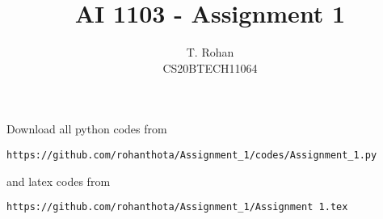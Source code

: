 \documentclass[journal,12pt,twocolumn]{IEEEtran}
\DeclareMathOperator*{\Res}{Res}
\begin{document}
\newcommand{\BEQA}{\begin{eqnarray}}
\newcommand{\EEQA}{\end{eqnarray}}
\newcommand{\define}{\stackrel{\triangle}{=}}

\raggedbottom
\setlength{\parindent}{0pt}
\providecommand{\mbf}{\mathbf}
\providecommand{\pr}[1]{\ensuremath{\Pr\left(#1\right)}}
\providecommand{\qfunc}[1]{\ensuremath{Q\left(#1\right)}}
\providecommand{\sbrak}[1]{\ensuremath{{}\left[#1\right]}}
\providecommand{\lsbrak}[1]{\ensuremath{{}\left[#1\right.}}
\providecommand{\rsbrak}[1]{\ensuremath{{}\left.#1\right]}}
\providecommand{\brak}[1]{\ensuremath{\left(#1\right)}}
\providecommand{\lbrak}[1]{\ensuremath{\left(#1\right.}}
\providecommand{\rbrak}[1]{\ensuremath{\left.#1\right)}}
\providecommand{\cbrak}[1]{\ensuremath{\left\{#1\right\}}}
\providecommand{\lcbrak}[1]{\ensuremath{\left\{#1\right.}}
\providecommand{\rcbrak}[1]{\ensuremath{\left.#1\right\}}}
\theoremstyle{remark}
\newtheorem{rem}{Remark}
\newcommand{\sgn}{\mathop{\mathrm{sgn}}}
\providecommand{\abs}[1]{\vert#1\vert}
\providecommand{\res}[1]{\Res\displaylimits_{#1}} 
\providecommand{\norm}[1]{\lVert#1\rVert}
\providecommand{\mtx}[1]{\mathbf{#1}}
\providecommand{\mean}[1]{E[ #1 ]}
\providecommand{\fourier}{\overset{\mathcal{F}}{ \rightleftharpoons}}
\providecommand{\system}{\overset{\mathcal{H}}{ \longleftrightarrow}}
\newcommand{\solution}{\noindent \textbf{Solution: }}
\newcommand{\cosec}{\,\text{cosec}\,}
\providecommand{\dec}[2]{\ensuremath{\overset{#1}{\underset{#2}{\gtrless}}}}
\newcommand{\myvec}[1]{\ensuremath{\begin{pmatrix}#1\end{pmatrix}}}
\newcommand{\mydet}[1]{\ensuremath{\begin{vmatrix}#1\end{vmatrix}}}
\makeatletter
{}
\makeatother
\let\StandardTheFigure\thefigure
\let\vec\mathbf
\renewcommand{\thefigure}{\theproblem}
\def\putbox#1#2#3{\makebox[0in][l]{\makebox[#1][l]{}\raisebox{\baselineskip}[0in][0in]{\raisebox{#2}[0in][0in]{#3}}}}
     \def\rightbox#1{\makebox[0in][r]{#1}}
     \def\centbox#1{\makebox[0in]{#1}}
     \def\topbox#1{\raisebox{-\baselineskip}[0in][0in]{#1}}
     \def\midbox#1{\raisebox{-0.5\baselineskip}[0in][0in]{#1}}
\vspace{3cm}
\title{AI 1103 - Assignment 1}
\author{T. Rohan \\ CS20BTECH11064}
\maketitle
\newpage
\bigskip
\renewcommand{\thefigure}{\theenumi}
\renewcommand{\thetable}{\theenumi}
Download all python codes from 
\begin{lstlisting}
https://github.com/rohanthota/Assignment_1/codes/Assignment_1.py
\end{lstlisting}
%
and latex codes from
%
\begin{lstlisting}
https://github.com/rohanthota/Assignment_1/Assignment 1.tex
\end{lstlisting}
\end{document}
